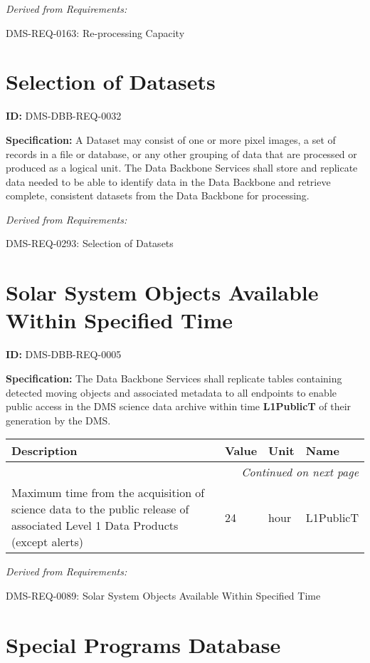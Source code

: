 \documentclass[SE,toc,lsstdraft]{lsstdoc}
\makeatletter
\newcommand{\paramname}[1]{\hspace{0pt}#1}
\newcommand{\unitname}[1]{\hspace{0pt}#1}
\newenvironment{parameters}[0]{%
\setlength\LTleft{0pt}
\setlength\LTright{\fill}
\begin{small}
\begin{longtable}[]{|p{0.49\textwidth}|l|p{0.6in}|p{1.70in}@{}|}

\hline \textbf{Description} & \textbf{Value} & \textbf{Unit} & \textbf{Name} \\ \hline
\endhead

\hline \multicolumn{4}{r}{\emph{Continued on next page}} \\
\endfoot

\hline\hline
\endlastfoot
}{%
\hline
\end{longtable}
\end{small}
}
\makeatother
\begin{document}
\emph{Derived from Requirements:}

DMS-REQ-0163:
Re-processing Capacity \newline

\section{Selection of Datasets}

\label{DMS-DBB-REQ-0032}
\textbf{ID:} DMS-DBB-REQ-0032

\textbf{Specification:}
A Dataset may consist of one or more pixel images, a set of records in a file or database, or any other grouping of data that are processed or produced as a logical unit. The Data Backbone Services shall store and replicate data needed to be able to identify data in the Data Backbone and retrieve complete, consistent datasets from the Data Backbone for processing.

\emph{Derived from Requirements:}

DMS-REQ-0293:
Selection of Datasets \newline

\section{Solar System Objects Available Within Specified Time}

\label{DMS-DBB-REQ-0005}
\textbf{ID:} DMS-DBB-REQ-0005

\textbf{Specification:}
The Data Backbone Services shall replicate tables containing detected moving objects and associated metadata to all endpoints to enable public access in the DMS science data archive within time \textbf{L1PublicT} of their generation by the DMS.

\begin{parameters}
Maximum time from the acquisition of science data to the public release of associated Level 1 Data Products (except alerts)
&
24
&
\unitname{%
hour
}
&
\paramname{%
L1PublicT
} \\\hline
\end{parameters}

\emph{Derived from Requirements:}

DMS-REQ-0089:
Solar System Objects Available Within Specified Time \newline

\section{Special Programs Database}
\end{document}
